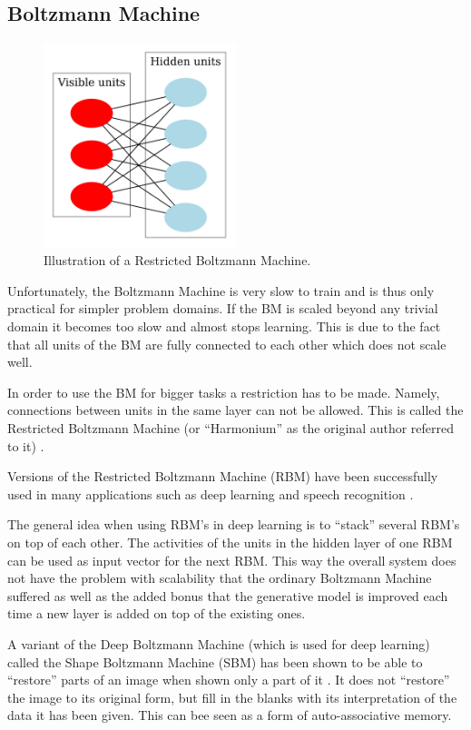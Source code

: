 \subsection{Boltzmann Machine}


\begin{figure}[htbp]
	\begin{center}
		\includegraphics[width=0.5\textwidth]{inc/Restricted_Boltzmann_machine.png}
		\caption{Illustration of a Restricted Boltzmann Machine.\protect\footnotemark}
		\label{fig:restricted_boltzmann_machine}
	\end{center}
\end{figure}

Unfortunately, the Boltzmann Machine is very slow to train and is thus only practical for simpler problem domains. If the BM is scaled beyond any trivial domain it becomes too slow and almost stops learning. This is due to the fact that all units of the BM are fully connected to each other which does not scale well.

In order to use the BM for bigger tasks a restriction has to be made. Namely, connections between units in the same layer can not be allowed. This is called the Restricted Boltzmann Machine (or ``Harmonium'' as the original author referred to it) \cite{smolensky1986information}.

Versions of the Restricted Boltzmann Machine (RBM) have been successfully used in many applications such as deep learning \cite{hinton2012better} and speech recognition \cite{dahl2010phone}.

The general idea when using RBM's in deep learning is to ``stack'' several RBM's on top of each other. The activities of the units in the hidden layer of one RBM can be used as input vector for the next RBM. This way the overall system does not have the problem with scalability that the ordinary Boltzmann Machine suffered as well as the added bonus that the generative model is improved each time a new layer is added on top of the existing ones.

A variant of the Deep Boltzmann Machine \cite{salakhutdinov2009deep} (which is used for deep learning) called the Shape Boltzmann Machine (SBM) has been shown to be able to ``restore'' parts of an image when shown only a part of it \cite{eslami2014shape}. It does not ``restore'' the image to its original form, but fill in the blanks with its interpretation of the data it has been given. This can bee seen as a form of auto-associative memory.
